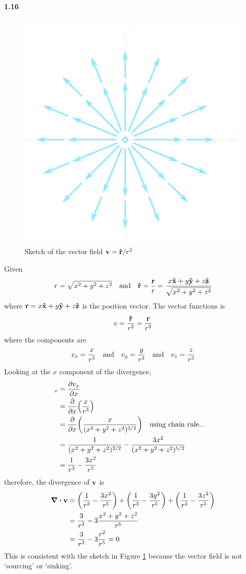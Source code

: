 \documentclass[../main.tex]{subfiles}
\begin{document}
\paragraph{1.16}
\begin{figure}[ht]
    \centering
    \includegraphics[width=0.4\linewidth]{images/fig1_16.png}
    \caption{Sketch of the vector field $\vb{v} = \vu{r} / r^2$}
    \label{fig:1.16}
\end{figure}
Given
\begin{align*}
    r = \sqrt{x^2 + y^2 + z^2} \qand
    \vu{r} = \frac{\vb{r}}{r} = \frac{x\vu{x} + y\vu{y} + z\vu{z}}{\sqrt{x^2 + y^2 + z^2}}
\end{align*}
where $\vb{r} = x\vu{x} + y\vu{y} + z\vu{z}$ is the position vector. The vector functions is
\begin{align*}
    v = \frac{\vu{r}}{r^2} = \frac{\vb{r}}{r^3}
\end{align*}
where the components are
\begin{align*}
    v_x = \frac{x}{r^3} \qand v_y = \frac{y}{r^3} \qand v_z = \frac{z}{r^3}
\end{align*}
Looking at the $x$ component of the divergence,
\begin{align*}
    [\div{\vb{v}}]_x &= \pdv{v_x}{x} \\
    &= \pdv{x}(\frac{x}{r^3}) \\
    &= \pdv{x}(\frac{x}{(x^2 + y^2 + z^2)^{3/2}}) \qq{using chain rule...}\\
    &= \frac{1}{(x^2 + y^2 + z^2)^{3/2}} - \frac{3x^2}{(x^2 + y^2 + z^2)^{5/2}} \\
    &= \frac{1}{r^3} - \frac{3x^2}{r^5}
\end{align*}
therefore, the divergence of $\vb{v}$ is
\begin{align*}
    \div{\vb{v}} &= \quantity(\frac{1}{r^3} - \frac{3x^2}{r^5})
        + \quantity(\frac{1}{r^3} - \frac{3y^2}{r^5})
        + \quantity(\frac{1}{r^3} - \frac{3z^2}{r^5}) \\
    &= \frac{3}{r^3} - 3\frac{x^2 + y^2 + z^2}{r^5} \\
    &= \frac{3}{r^3} - 3\frac{r^2}{r^5} = 0
\end{align*}
This is consistent with the sketch in Figure \ref{fig:1.16} because the vector field is not 
`sourcing' or `sinking'.
\end{document}
